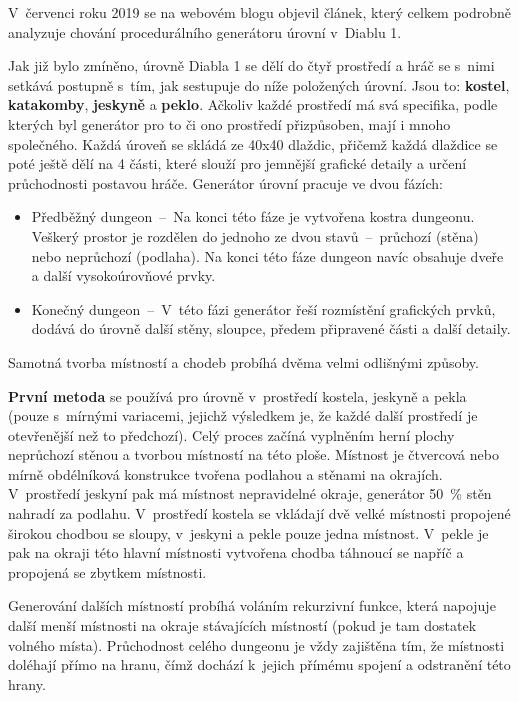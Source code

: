 V~červenci roku 2019 se na webovém blogu objevil článek\cite{lit:diablo_1}, který celkem podrobně analyzuje chování procedurálního generátoru úrovní v~Diablu 1.
\par
Jak již bylo zmíněno, úrovně Diabla 1 se dělí do čtyř prostředí a hráč se s~nimi setkává postupně s~tím, jak sestupuje do níže položených úrovní.
Jsou to: \textbf{kostel}, \textbf{katakomby}, \textbf{jeskyně} a \textbf{peklo}.
Ačkoliv každé prostředí má svá specifika, podle kterých byl generátor pro to či ono prostředí přizpůsoben, mají i mnoho společného.
Každá úroveň se skládá ze 40x40 dlaždic, přičemž každá dlaždice se poté ještě dělí na 4 části, které slouží pro jemnější grafické detaily a určení průchodnosti postavou hráče.
Generátor úrovní pracuje ve dvou fázích:
\begin{itemize}
    \item Předběžný dungeon~--~Na konci této fáze je vytvořena kostra dungeonu.
    Veškerý prostor je rozdělen do jednoho ze dvou stavů~--~průchozí (stěna) nebo neprůchozí (podlaha).
    Na konci této fáze dungeon navíc obsahuje dveře a další vysokoúrovňové prvky.
    \item Konečný dungeon~--~V~této fázi generátor řeší rozmístění grafických prvků, dodává do úrovně další stěny, sloupce, předem připravené části a další detaily.
\end{itemize}
Samotná tvorba místností a chodeb probíhá dvěma velmi odlišnými způsoby.
\par
\textbf{První metoda} se používá pro úrovně v~prostředí kostela, jeskyně a pekla (pouze s~mírnými variacemi, jejichž výsledkem je, že každé další prostředí je otevřenější než to předchozí).
Celý proces začíná vyplněním herní plochy neprůchozí stěnou a tvorbou místností na této ploše.
Místnost je čtvercová nebo mírně obdélníková konstrukce tvořena podlahou a stěnami na okrajích.
V~prostředí jeskyní pak má místnost nepravidelné okraje, generátor 50~\% stěn nahradí za podlahu.
V~prostředí kostela se vkládají dvě velké místnosti propojené širokou chodbou se sloupy, v~jeskyni a pekle pouze jedna místnost.
V~pekle je pak na okraji této hlavní místnosti vytvořena chodba táhnoucí se napříč a propojená se zbytkem místnosti.
\par
Generování dalších místností probíhá voláním rekurzivní funkce, která napojuje další menší místnosti na okraje stávajících místností (pokud je tam dostatek volného místa).
Průchodnost celého dungeonu je vždy zajištěna tím, že místnosti doléhají přímo na hranu, čímž dochází k~jejich přímému spojení a odstranění této hrany.
